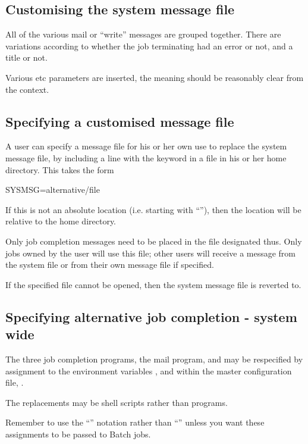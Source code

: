 \subsection{Customising the system message file}
All of the various mail or ``write'' messages are grouped together. There are variations according to whether the job
terminating had an error or not, and a title or not.

Various  etc parameters are inserted, the meaning should be reasonably clear from the context.

\subsection{Specifying a customised message file}
A user can specify a message file for his or her own use to replace the system message file, by including a line with the keyword
 in a \homeconfigpath{} file in his or her home directory. This takes the form

\begin{expara}

SYSMSG=alternative/file

\end{expara}

If this is not an absolute location (i.e. starting with ``\exampletext{/}''), then the
location will be relative to the home directory.

Only job completion messages need to be placed in the file designated thus. Only jobs owned by the user will use this file; other users will
receive a message from the system file or from their own message file if specified.

If the specified file cannot be opened, then the system message file is reverted to.

\subsection{Specifying alternative job completion - system wide}
The three job completion programs, the mail program,  and 
may be respecified by assignment to the environment variables ,  and
 within the master configuration file, \masterconfig.

The replacements may be shell scripts rather than programs.

Remember to use the ``\exampletext{:}'' notation rather than ``\exampletext{=}'' unless you
want these assignments to be passed to Batch jobs.

